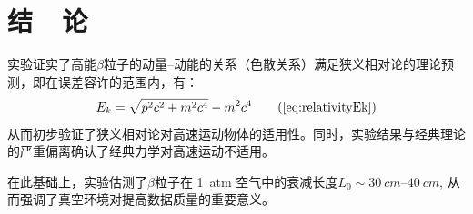 \documentclass{buaaemp}
\begin{document}
\section{结~~论}
实验证实了高能$\beta$粒子的动量--动能的关系（色散关系）满足狭义相对论的理论预测，即在误差容许的范围内，有：
	\begin{equation}
		E_k = \sqrt{p^2 c^2 + m^2 c^4} - m^2 c^4
		\tag{\ref{eq:relativityEk}}
	\end{equation}
	从而初步验证了狭义相对论对高速运动物体的适用性。同时，实验结果与经典理论的严重偏离确认了经典力学对高速运动不适用。
	
	在此基础上，实验估测了$\beta$粒子在 \SI{1}{atm} 空气中的衰减长度$L_0 \sim \SIrange{30}{40}{cm}$, 从而强调了真空环境对提高数据质量的重要意义。



\renewcommand\refname{\heiti\wuhao\centerline{参考文献}\global\def\refname{参考文献}}
\vskip 12pt

\let\OLDthebibliography\thebibliography
\renewcommand\thebibliography[1]{
  \OLDthebibliography{#1}
  \setlength{\parskip}{0pt}
  \setlength{\itemsep}{0pt plus 0.3ex}
}

{
\renewcommand{\baselinestretch}{0.9}
\liuhao


}
\end{document}
